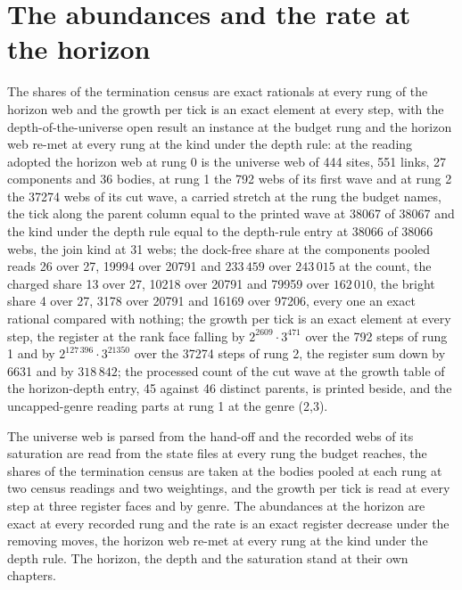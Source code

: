 \section{The abundances and the rate at the horizon}\label{mod:X-3-D543792-abrh-t1}
\begin{chtheorem}\label{box:X-3-D543792-abrh-t1:1}
The shares of the termination census are exact rationals at every rung of the horizon web and the growth per tick is an exact element at every step, with the depth-of-the-universe open result an instance at the budget rung and the horizon web re-met at every rung at the kind under the depth rule: at the reading adopted the horizon web at rung 0 is the universe web of 444 sites, 551 links, 27 components and 36 bodies, at rung 1 the 792 webs of its first wave and at rung 2 the 37274 webs of its cut wave, a carried stretch at the rung the budget names, the tick along the parent column equal to the printed wave at 38067 of 38067 and the kind under the depth rule equal to the depth-rule entry at 38066 of 38066 webs, the join kind at 31 webs; the dock-free share at the components pooled reads 26 over 27, 19994 over 20791 and $233\,459$ over $243\,015$ at the count, the charged share 13 over 27, 10218 over 20791 and 79959 over $162\,010$, the bright share 4 over 27, 3178 over 20791 and 16169 over 97206, every one an exact rational compared with nothing; the growth per tick is an exact element at every step, the register at the rank face falling by $2^{2609}\cdot 3^{471}$ over the 792 steps of rung 1 and by $2^{127\,396}\cdot 3^{21350}$ over the 37274 steps of rung 2, the register sum down by 6631 and by $318\,842$; the processed count of the cut wave at the growth table of the horizon-depth entry, 45 against 46 distinct parents, is printed beside, and the uncapped-genre reading parts at rung 1 at the genre (2,3).
\end{chtheorem}
The universe web is parsed from the hand-off and the recorded webs of its saturation are read from the state files at every rung the budget reaches, the shares of the termination census are taken at the bodies pooled at each rung at two census readings and two weightings, and the growth per tick is read at every step at three register faces and by genre. The abundances at the horizon are exact at every recorded rung and the rate is an exact register decrease under the removing moves, the horizon web re-met at every rung at the kind under the depth rule. The horizon, the depth and the saturation stand at their own chapters.
